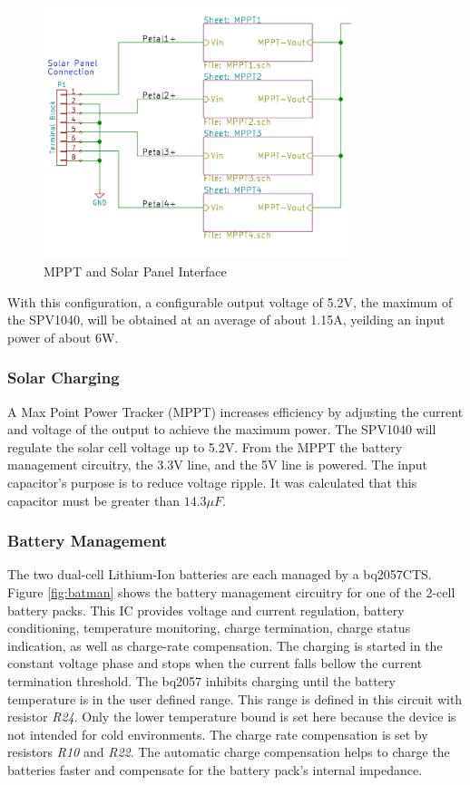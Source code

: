 \documentclass{article}
\numberwithin{figure}{section}
\numberwithin{equation}{section}
\begin{document}
{\begin{figure}[H]
	\centering
	\includegraphics[width=0.8\textwidth]{MPPTblocks}
	\caption{MPPT and Solar Panel Interface}
	\label{fig:mpptsol}
\end{figure}

With this configuration, a configurable output voltage of 5.2V, the maximum of the SPV1040, will be obtained at an average of about 1.15A, yeilding an input power of about 6W.

\subsubsection{Solar Charging}


A Max Point Power Tracker (MPPT) increases efficiency by adjusting the current and voltage of the output to achieve the maximum power. The SPV1040 will regulate the solar cell voltage up to 5.2V. From the MPPT the battery management circuitry, the 3.3V line, and the 5V line is powered. The input capacitor's purpose is to reduce voltage ripple. It was calculated that this capacitor must be greater than $14.3\mu F$.


\subsubsection{Battery Management}

The two dual-cell Lithium-Ion batteries are each managed by a bq2057CTS. Figure \ref{fig:batman} shows the battery management circuitry for one of the 2-cell battery packs. This IC provides voltage and current regulation, battery conditioning, temperature monitoring, charge termination, charge status indication, as well as charge-rate compensation. The charging is started in the constant voltage phase and stops when the current falls bellow the current termination threshold. The bq2057 inhibits charging until the battery temperature is in the user defined range. This range is defined in this circuit with resistor \textit{R24}. Only the lower temperature bound is set here because the device is not intended for cold environments. The charge rate compensation is set by resistors \textit{R10} and \textit{R22}. The automatic charge compensation helps to charge the batteries faster and compensate for the battery pack's internal impedance.

}
\end{document}
